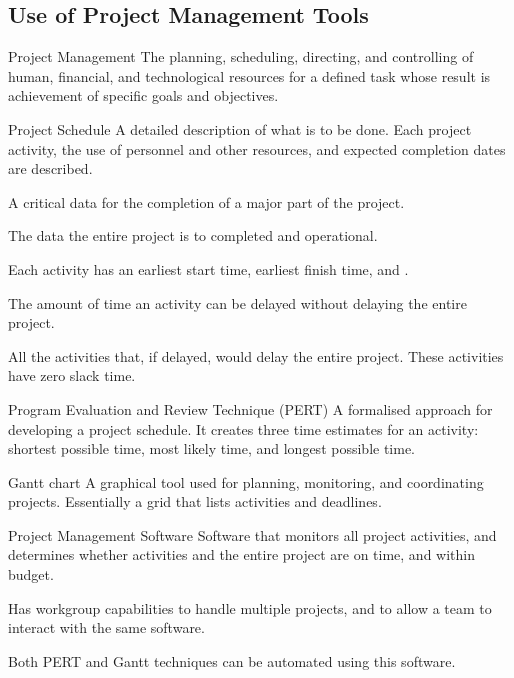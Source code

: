 \documentclass[\main/notes.tex]{subfiles}
\begin{document}
			\subsection{Use of Project Management Tools}
				\begin{definition}{Project Management}
					The planning, scheduling, directing, and controlling of human, financial, and technological resources for a defined task whose result is achievement of specific goals and objectives.
				\end{definition}
				\begin{definition}{Project Schedule}
					A detailed description of what is to be done. Each project activity, the use of personnel and other resources, and expected completion dates are described.
					\begin{indentparagraph}
						\begin{description}[nosep]
							\item[Project Milestone] A critical data for the completion of a major part of the project.
							\item[Project Deadline] The data the entire project is to completed and operational.
						\end{description}
					\end{indentparagraph}
					Each activity has an earliest start time, earliest finish time, and \concept{slack time}.
					\begin{indentparagraph}
						\begin{description}[nosep]
							\item[Slack Time] The amount of time an activity can be delayed without delaying the entire project.
							\item[Critical Path] All the activities that, if delayed, would delay the entire project. These activities have zero slack time.
						\end{description}
					\end{indentparagraph}
				\end{definition}
				\begin{definition}{Program Evaluation and Review Technique (PERT)}
					A formalised approach for developing a project schedule. It creates three time estimates for an activity: shortest possible time, most likely time, and longest possible time.
				\end{definition}
				\begin{definition}{Gantt chart}
					A graphical tool used for planning, monitoring, and coordinating projects. Essentially a grid that lists activities and deadlines.
				\end{definition}
				\begin{definition}{Project Management Software}
					Software that monitors all project activities, and determines whether activities and the entire project are on time, and within budget.

					Has workgroup capabilities to handle multiple projects, and to allow a team to interact with the same software.

					Both PERT and Gantt techniques can be automated using this software.
				\end{definition}
\end{document}
